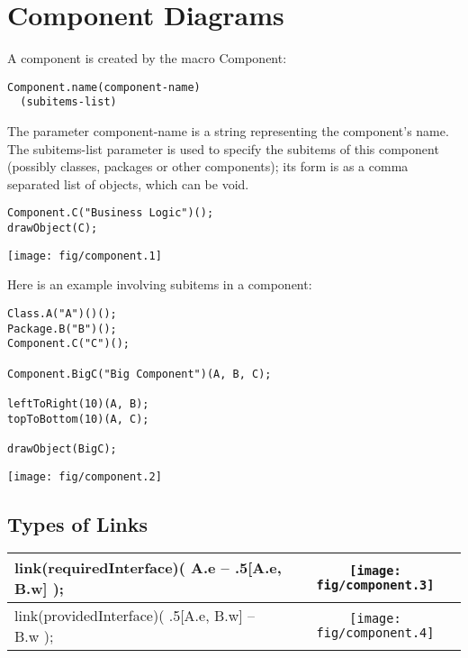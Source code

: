 \documentclass{article}
\newcommand{\code}{\ttfamily}
\begin{document}
\section{Component Diagrams}

A component is created by the macro {\code Component}:

\begin{verbatim}
Component.name(component-name)
  (subitems-list)
\end{verbatim}

The parameter {\code component-name} is a string representing the component's name. The {\code subitems-list} parameter is used to specify the subitems of this component (possibly classes, packages or other components); its form is as a comma separated list of objects, which can be void.

\begin{multicols}{2}
\begin{verbatim}
Component.C("Business Logic")();
drawObject(C);
\end{verbatim}
\columnbreak
\hspace{3cm}\texttt{[image: fig/component.1]}
\end{multicols}

Here is an example involving subitems in a component:

\begin{multicols}{2}
\begin{verbatim}
Class.A("A")()();
Package.B("B")();
Component.C("C")();

Component.BigC("Big Component")(A, B, C);

leftToRight(10)(A, B);
topToBottom(10)(A, C);

drawObject(BigC);
\end{verbatim}
\columnbreak
\hspace{3cm}\texttt{[image: fig/component.2]}
\end{multicols}

\subsection{Types of Links}

\begin{tabular}{||l|c||}
\hline
{\code link(requiredInterface)( A.e -- .5[A.e, B.w] );} & \texttt{[image: fig/component.3]} \\
\hline
{\code link(providedInterface)( .5[A.e, B.w] -- B.w );} & \texttt{[image: fig/component.4]} \\
\hline
\end{tabular}
\end{document}
